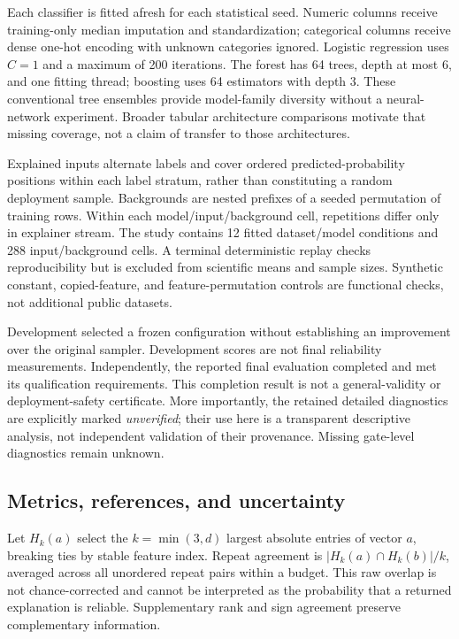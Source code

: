 \documentclass{article}
\begin{document}
Each classifier is fitted afresh for each statistical seed. Numeric columns receive training-only median imputation and standardization; categorical columns receive dense one-hot encoding with unknown categories ignored. Logistic regression uses $C=1$ and a maximum of 200 iterations. The forest has 64 trees, depth at most 6, and one fitting thread; boosting uses 64 estimators with depth 3. These conventional tree ensembles \citep{Breiman2001,Friedman2001} provide model-family diversity without a neural-network experiment. Broader tabular architecture comparisons \citep{Gorishniy2021} motivate that missing coverage, not a claim of transfer to those architectures.

Explained inputs alternate labels and cover ordered predicted-probability positions within each label stratum, rather than constituting a random deployment sample. Backgrounds are nested prefixes of a seeded permutation of training rows. Within each model/input/background cell, repetitions differ only in explainer stream. The study contains 12 fitted dataset/model conditions and 288 input/background cells. A terminal deterministic replay checks reproducibility but is excluded from scientific means and sample sizes. Synthetic constant, copied-feature, and feature-permutation controls are functional checks, not additional public datasets.

Development selected a frozen configuration without establishing an improvement over the original sampler. Development scores are not final reliability measurements. Independently, the reported final evaluation completed and met its qualification requirements. This completion result is not a general-validity or deployment-safety certificate. More importantly, the retained detailed diagnostics are explicitly marked \emph{unverified}; their use here is a transparent descriptive analysis, not independent validation of their provenance. Missing gate-level diagnostics remain unknown.

\subsection{Metrics, references, and uncertainty}
Let $H_k(a)$ select the $k=\min(3,d)$ largest absolute entries of vector $a$, breaking ties by stable feature index. Repeat agreement is $|H_k(a)\cap H_k(b)|/k$, averaged across all unordered repeat pairs within a budget. This raw overlap is not chance-corrected and cannot be interpreted as the probability that a returned explanation is reliable. Supplementary rank and sign agreement preserve complementary information.
\end{document}
